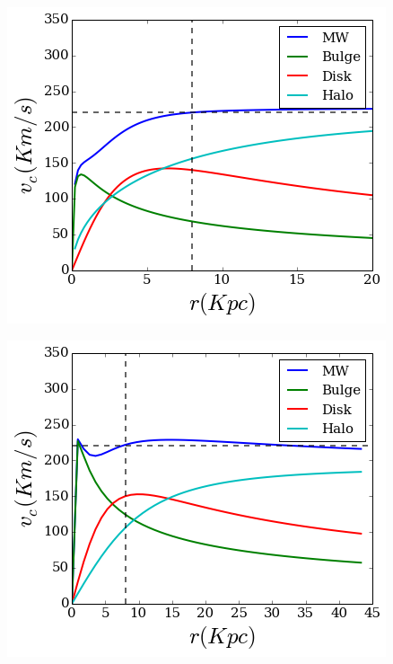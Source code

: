 \begin{figure}[H]\label{MWBesla07}
\centering
\includegraphics[scale=0.7]{../figures/MWBEsla07.png}
\end{figure}



\begin{figure}[H]\label{MWLM10}
\centering
\includegraphics[scale=0.7]{../figures/MWLM10.png}
\end{figure}


